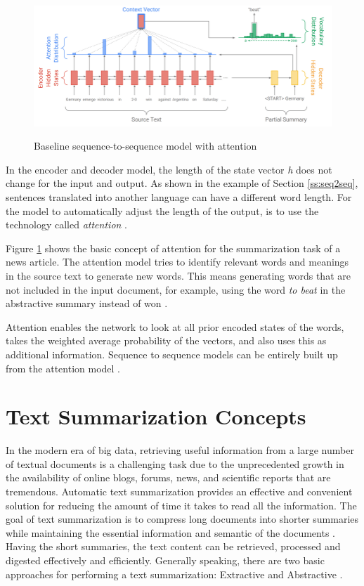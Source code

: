 \begin{figure}
	\begin{center}
		\includegraphics[width=6.5in]{photos/attenion}\\
		\caption{Baseline sequence-to-sequence model with attention \cite{see-etal-2017-get} }\label{attention1}
	\end{center}
\end{figure}

In the encoder and decoder model, the length of the state vector \textit{h} does not change for the input and output. As shown in the example of Section \ref{ss:seq2seq}, sentences translated into another language can have a different word length. For the model to automatically adjust the length of the output, is to use the technology called \textit{attention} \cite{attention} \cite{attention2}.

Figure \ref{attention1} shows the basic concept of attention for the summarization task of a news article.  The attention model tries to identify relevant words and meanings in the source text to generate new words. This means generating words that are not included in the input document, for example, using the word \textit{to beat} in the abstractive summary instead of won \cite{see-etal-2017-get}.

Attention enables the network to look at all prior encoded states of the words, takes the weighted average probability of the vectors, and also uses this as additional information. Sequence to sequence models can be entirely built up from the attention model \cite{attention2}. 

\section{Text Summarization Concepts}

In the modern era of big data, retrieving useful information from a large number of textual documents is a challenging task due to the unprecedented growth in the availability of online blogs, forums, news, and scientific reports that are tremendous. Automatic text summarization provides an effective and convenient solution for reducing the amount of time it takes to read all the information. The goal of text summarization is to compress long documents into shorter summaries while maintaining the essential information and semantic of the documents \cite{ts-intro} \cite{ts-intro2}. Having the short summaries, the text content can be retrieved, processed and digested effectively and efficiently. 
Generally speaking, there are two basic approaches for performing a text summarization: Extractive and Abstractive \cite{ts-intro3}. 


